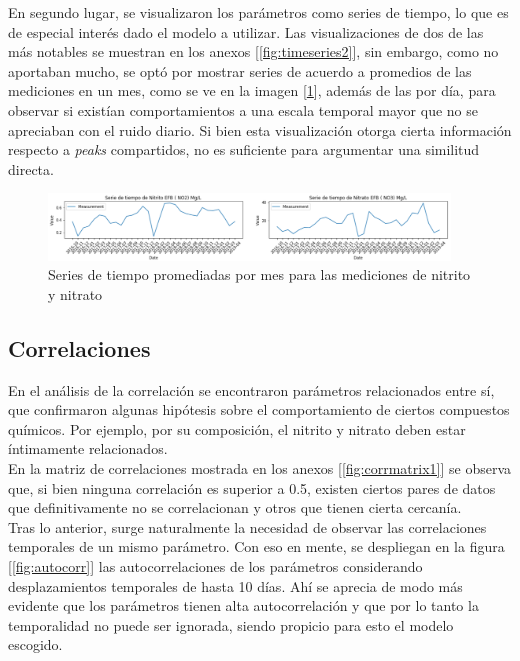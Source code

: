 \documentclass[letterpaper, 12pt]{article}
\begin{document}
En segundo lugar, se visualizaron los parámetros como series de tiempo, lo que es de especial interés dado el modelo a utilizar. Las visualizaciones de dos de las más notables se muestran en los anexos [\ref{fig:timeseries2}], sin embargo, como no aportaban mucho, se optó por mostrar series de acuerdo a promedios de las mediciones en un mes, como se ve en la imagen [\ref{fig:timeseries1}], además de las por día, para observar si existían comportamientos a una escala temporal mayor que no se apreciaban con el ruido diario. Si bien esta visualización otorga cierta información respecto a \textit{peaks} compartidos, no es suficiente para argumentar una similitud directa.

\begin{figure}[H]
  \centering
    \includegraphics[width=0.95\textwidth]{img/timeseries1.png}
  \caption{Series de tiempo promediadas por mes para las mediciones de nitrito y nitrato}
  \label{fig:timeseries1}
\end{figure}

\subsection{Correlaciones}
En el análisis de la correlación se encontraron parámetros relacionados entre sí, que confirmaron algunas hipótesis sobre el comportamiento de ciertos compuestos químicos. Por ejemplo, por su composición, el nitrito y nitrato deben estar íntimamente relacionados.\\

En la matriz de correlaciones mostrada en los anexos [\ref{fig:corrmatrix1}] se observa que, si bien ninguna correlación es superior a 0.5, existen ciertos pares de datos que definitivamente no se correlacionan y otros que tienen cierta cercanía.\\

Tras lo anterior, surge naturalmente la necesidad de observar las correlaciones temporales de un mismo parámetro. Con eso en mente, se despliegan en la figura [\ref{fig:autocorr}] las autocorrelaciones de los parámetros considerando desplazamientos temporales de hasta 10 días. Ahí se aprecia de modo más evidente que los parámetros tienen alta autocorrelación y que por lo tanto la temporalidad no puede ser ignorada, siendo propicio para esto el modelo escogido.\\
\end{document}

